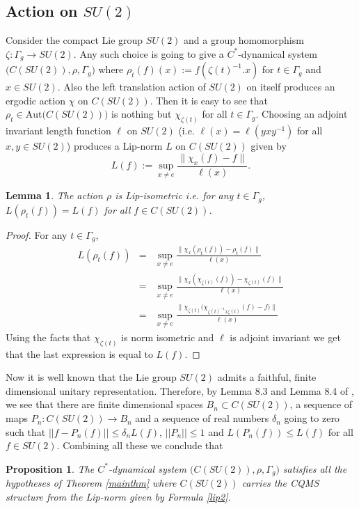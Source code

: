 \documentclass[a4paper,11pt,reqno]{amsart}
\theoremstyle{plain}
\newtheorem{lem}[thm]{Lemma}
\newtheorem{prop}[thm]{Proposition}
\theoremstyle{mainthmstyle}
\theoremstyle{named}
\numberwithin{equation}{section}
\newcommand{\Bea}{\begin{eqnarray*}}
\newcommand{\Eea}{\end{eqnarray*}}
\begin{document}
\subsection{Action on \texorpdfstring{$SU(2)$}{SU(2)}} Consider the compact Lie group $SU(2)$ and a group homomorphism $\zeta:\Gamma_g\rightarrow SU(2)$. Any such choice is going to give a $C^{\ast}$-dynamical system $\big(C(SU(2)),\rho,\Gamma_g\big)$ where $\rho_{t}(f)(x):=f(\zeta(t)^{-1}.x)$ for $t\in \Gamma_g$ and $x\in SU(2)$. Also the left translation action of $SU(2)$ on itself produces an ergodic action $\chi$ on $C(SU(2))$. Then it is easy to see that $\rho_{t}\in\mathrm{Aut}\big(C(SU(2))\big)$ is nothing but $\chi_{\zeta(t)}$ for all $t\in\Gamma_g$. Choosing an adjoint invariant length function $\ell$ on $SU(2)$ (i.e. $\ell(x)=\ell(yxy^{-1})$ for all $x,y\in SU(2)$) produces a Lip-norm $L$ on $C(SU(2))$ given by
\begin{equation}\label{lip2}
    L(f):=\sup_{x\neq e}\frac{\|\chi_{x}(f)-f \|}{\ell(x)}.
\end{equation}
\begin{lem}
    The action $\rho$ is Lip-isometric i.e. for any $t\in\Gamma_g$, $L(\rho_t(f))=L(f)$ for all $f\in C(SU(2))$.
\end{lem}
\begin{proof}
For any $t\in\Gamma_g$, 
\Bea
L(\rho_t(f))&=& \sup_{x\neq e}\frac{\|\chi_{x}(\rho_t(f))-\rho_t(f) \|}{\ell(x)}\\
&=& \sup_{x\neq e}\frac{\|\chi_{x}(\chi_{\zeta(t)}(f))-\chi_{\zeta(t)}(f) \|}{\ell(x)}\\
&=&\sup_{x\neq e}\frac{\|\chi_{\zeta(t)}\big(\chi_{\zeta(t)^{-1}x\zeta(t)}(f)-f\big) \|}{\ell(x)}
\Eea
Using the facts that $\chi_{\zeta(t)}$ is norm isometric and $\ell$ is adjoint invariant we get that the last expression is equal to $L(f)$.\end{proof}
Now it is well known that the Lie group $SU(2)$ admits a faithful, finite dimensional unitary representation. Therefore, by Lemma 8.3 and Lemma 8.4 of \cite{Rieffel-Gromov}, we see that there are finite dimensional spaces $B_n\subset C(SU(2))$, a sequence of maps $P_{n}:C(SU(2))\rightarrow B_{n}$ and a sequence of real numbers $\delta_{n}$ going to zero such that $\lvert\lvert f-P_{n}(f)\rvert\rvert\leq\delta_n L(f)$, $\lvert\lvert P_n\rvert\rvert\leq 1$ and $L(P_n(f))\leq L(f)$ for all $f\in SU(2)$.  Combining all these we conclude that
\begin{prop}
    The $C^*$-dynamical system $\big(C(SU(2)),\rho,\Gamma_g\big)$ satisfies all the hypotheses of Theorem \ref{mainthm} where $C(SU(2))$ carries the CQMS structure from the Lip-norm given by Formula \ref{lip2}.
\end{prop}
\end{document}
